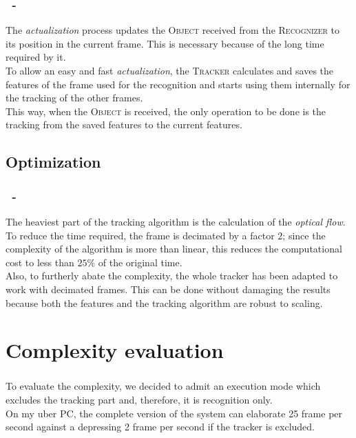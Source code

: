 \documentclass{beamer}
\begin{document}
  \begin{frame}
    \frametitle{\insertsection\ - \insertsubsection}
    The \emph{actualization} process updates the \textsc{Object} received from
    the \textsc{Recognizer} to its position in the current frame. This is
    necessary because of the long time required by it.\\
    To allow an easy and fast \emph{actualization}, the \textsc{Tracker}
    calculates and saves the features of the frame used for the recognition
    and starts using them internally for the tracking of the other frames.\\
    This way, when the \textsc{Object} is received, the only operation to be
    done is the tracking from the saved features to the current features.\\
  \end{frame}
  
  \subsection{Optimization}

  \begin{frame}
    \frametitle{\insertsection\ - \insertsubsection}
    The heaviest part of the tracking algorithm is the calculation of the
    \emph{optical flow}. To reduce the time required, the frame is
    decimated by a factor $2$; since the complexity of the algorithm is
    more than linear, this reduces the computational cost to less than
    $25\%$ of the original time.\\
    Also, to furtherly abate the complexity, the whole tracker has been
    adapted to work with decimated frames. This can be done without damaging
    the results because both the features and the tracking algorithm are
    robust to scaling.\\
  \end{frame}

  \section{Complexity evaluation}

  \begin{frame}
    \frametitle{\insertsection}
	To evaluate the complexity, we decided to admit an execution mode which
	excludes the tracking part and, therefore, it is recognition only.\\
	On my uber PC, the complete version of the system can elaborate
	25 frame per second against a depressing 2 frame per second if the tracker
	is excluded.
  \end{frame}
\end{document}

